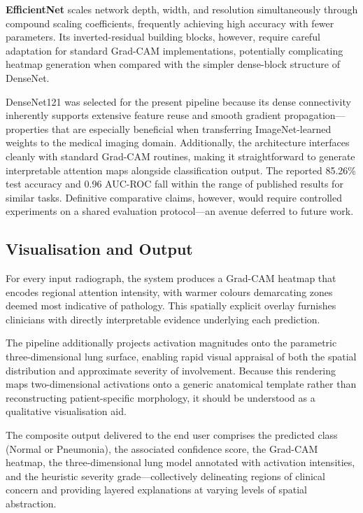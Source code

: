 \documentclass[conference]{IEEEtran}
\begin{document}
\textbf{EfficientNet} scales network depth, width, and resolution simultaneously through compound scaling coefficients, frequently achieving high accuracy with fewer parameters. Its inverted-residual building blocks, however, require careful adaptation for standard Grad-CAM implementations, potentially complicating heatmap generation when compared with the simpler dense-block structure of DenseNet.

DenseNet121 was selected for the present pipeline because its dense connectivity inherently supports extensive feature reuse and smooth gradient propagation---properties that are especially beneficial when transferring ImageNet-learned weights to the medical imaging domain. Additionally, the architecture interfaces cleanly with standard Grad-CAM routines, making it straightforward to generate interpretable attention maps alongside classification output. The reported 85.26\% test accuracy and 0.96 AUC-ROC fall within the range of published results for similar tasks. Definitive comparative claims, however, would require controlled experiments on a shared evaluation protocol---an avenue deferred to future work.

\subsection{Visualisation and Output}

For every input radiograph, the system produces a Grad-CAM heatmap that encodes regional attention intensity, with warmer colours demarcating zones deemed most indicative of pathology. This spatially explicit overlay furnishes clinicians with directly interpretable evidence underlying each prediction.

The pipeline additionally projects activation magnitudes onto the parametric three-dimensional lung surface, enabling rapid visual appraisal of both the spatial distribution and approximate severity of involvement. Because this rendering maps two-dimensional activations onto a generic anatomical template rather than reconstructing patient-specific morphology, it should be understood as a qualitative visualisation aid.

The composite output delivered to the end user comprises the predicted class (Normal or Pneumonia), the associated confidence score, the Grad-CAM heatmap, the three-dimensional lung model annotated with activation intensities, and the heuristic severity grade---collectively delineating regions of clinical concern and providing layered explanations at varying levels of spatial abstraction.
\end{document}
